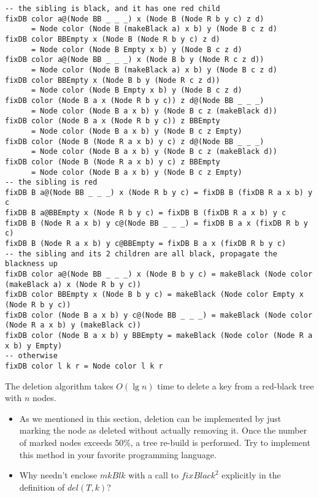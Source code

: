 \documentclass{article}
\begin{document}
\begin{lstlisting}
-- the sibling is black, and it has one red child
fixDB color a@(Node BB _ _ _) x (Node B (Node R b y c) z d)
      = Node color (Node B (makeBlack a) x b) y (Node B c z d)
fixDB color BBEmpty x (Node B (Node R b y c) z d)
      = Node color (Node B Empty x b) y (Node B c z d)
fixDB color a@(Node BB _ _ _) x (Node B b y (Node R c z d))
      = Node color (Node B (makeBlack a) x b) y (Node B c z d)
fixDB color BBEmpty x (Node B b y (Node R c z d))
      = Node color (Node B Empty x b) y (Node B c z d)
fixDB color (Node B a x (Node R b y c)) z d@(Node BB _ _ _)
      = Node color (Node B a x b) y (Node B c z (makeBlack d))
fixDB color (Node B a x (Node R b y c)) z BBEmpty
      = Node color (Node B a x b) y (Node B c z Empty)
fixDB color (Node B (Node R a x b) y c) z d@(Node BB _ _ _)
      = Node color (Node B a x b) y (Node B c z (makeBlack d))
fixDB color (Node B (Node R a x b) y c) z BBEmpty
      = Node color (Node B a x b) y (Node B c z Empty)
-- the sibling is red
fixDB B a@(Node BB _ _ _) x (Node R b y c) = fixDB B (fixDB R a x b) y c
fixDB B a@BBEmpty x (Node R b y c) = fixDB B (fixDB R a x b) y c
fixDB B (Node R a x b) y c@(Node BB _ _ _) = fixDB B a x (fixDB R b y c)
fixDB B (Node R a x b) y c@BBEmpty = fixDB B a x (fixDB R b y c)
-- the sibling and its 2 children are all black, propagate the blackness up
fixDB color a@(Node BB _ _ _) x (Node B b y c) = makeBlack (Node color (makeBlack a) x (Node R b y c))
fixDB color BBEmpty x (Node B b y c) = makeBlack (Node color Empty x (Node R b y c))
fixDB color (Node B a x b) y c@(Node BB _ _ _) = makeBlack (Node color (Node R a x b) y (makeBlack c))
fixDB color (Node B a x b) y BBEmpty = makeBlack (Node color (Node R a x b) y Empty)
-- otherwise
fixDB color l k r = Node color l k r
\end{lstlisting}

The deletion algorithm takes $O(\lg n)$ time to delete a key from
a red-black tree with $n$ nodes.

\begin{Exercise}

\begin{itemize}
\item As we mentioned in this section, deletion can be implemented
by just marking the node as deleted without actually removing it.
Once the number of marked nodes exceeds 50\%, a tree re-build is performed. Try to implement this
method in your favorite programming language.
\item Why needn't enclose $mkBlk$ with a call to $fixBlack^2$ explicitly in the definition of $del(T, k)$?
\end{itemize}

\end{Exercise}
\end{document}
